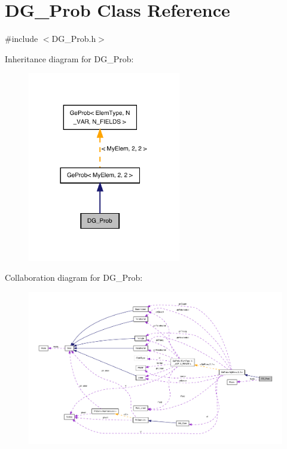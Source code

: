 \hypertarget{classDG__Prob}{}\section{D\+G\+\_\+\+Prob Class Reference}
\label{classDG__Prob}


{\ttfamily \#include $<$D\+G\+\_\+\+Prob.\+h$>$}



Inheritance diagram for D\+G\+\_\+\+Prob\+:
\nopagebreak
\begin{figure}[H]
\begin{center}
\leavevmode
\includegraphics[width=189pt]{classDG__Prob__inherit__graph}
\end{center}
\end{figure}


Collaboration diagram for D\+G\+\_\+\+Prob\+:
\nopagebreak
\begin{figure}[H]
\begin{center}
\leavevmode
\includegraphics[width=350pt]{classDG__Prob__coll__graph}
\end{center}
\end{figure}
